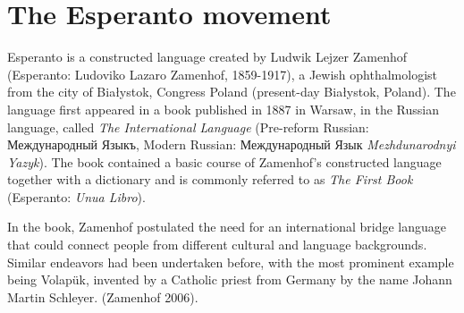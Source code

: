 \section{The Esperanto movement}

Esperanto is a constructed language created by Ludwik Lejzer Zamenhof (Esperanto: Ludoviko Lazaro Zamenhof, 1859-1917), a Jewish ophthalmologist from the city of Białystok, Congress Poland (present-day Białystok, Poland).
The language first appeared in a book published in 1887 in Warsaw, in the Russian language, called \textit{The International Language} (Pre-reform Russian: Международный Языкъ, Modern Russian: Международный Язык \textit{Mezhdunarodnyi Yazyk}).
The book contained a basic course of Zamenhof's constructed language together with a dictionary and is commonly referred to as \textit{The First Book} (Esperanto: \textit{Unua Libro}).

In the book, Zamenhof postulated the need for an international bridge language that could connect people from different cultural and language backgrounds.
Similar endeavors had been undertaken before, with the most prominent example being Volapük, invented by a Catholic priest from Germany by the name Johann Martin Schleyer.
(Zamenhof 2006).
